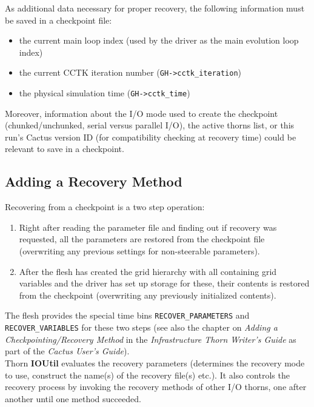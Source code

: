\documentclass{article}
\begin{document}
As additional data necessary for proper recovery, the following information
must be saved in a checkpoint file:
\begin{itemize}
  \item the current main loop index (used by the driver as the main evolution
    loop index)
  \item the current CCTK iteration number ({\tt GH->cctk\_iteration})
  \item the physical simulation time ({\tt GH->cctk\_time})
\end{itemize}

Moreover, information about the I/O mode used to create the checkpoint
(chunked/unchunked, serial versus parallel I/O), the active thorns list, or
this run's Cactus version ID (for compatibility checking at recovery time) could
be relevant to save in a checkpoint.


\subsection{Adding a Recovery Method}

Recovering from a checkpoint is a two step operation:
\begin{enumerate}
  \item Right after reading the parameter file and finding out if recovery was
    requested, all the parameters are restored from the checkpoint file
    (overwriting any previous settings for non-steerable parameters).
  \item After the flesh has created the grid hierarchy with all containing grid
    variables and the driver has set up storage for these, their contents is
    restored from the checkpoint (overwriting any previously initialized
    contents).
\end{enumerate}

The flesh provides the special time bins {\tt RECOVER\_PARAMETERS} and
{\tt RECOVER\_VARIABLES} for these two steps (see also the chapter on
{\it Adding a Checkpointing/Recovery Method} in the {\it Infrastructure Thorn
Writer's Guide} as part of the {\it Cactus User's Guide}).\\

Thorn {\bf IOUtil} evaluates the recovery parameters (determines the recovery
mode to use, construct the name(s) of the recovery file(s) etc.).
It also controls the recovery process by invoking the recovery methods of
other I/O thorns, one after another until one method succeeded.\\
\end{document}
